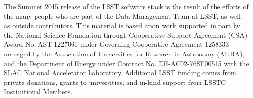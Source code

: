 \documentclass[11pt,twoside]{article}
\begin{document}
\acknowledgements The Summer 2015 release of the LSST software stack
is the result of the efforts of the many people who are part of the
Data Management Team at LSST, as well as outside contributors.  This
material is based upon work supported in part by the National Science
Foundation through Cooperative Support Agreement (CSA) Award
No. AST-1227061 under Governing Cooperative Agreement 1258333 managed
by the Association of Universities for Research in Astronomy (AURA),
and the Department of Energy under Contract No. DE-AC02-76SF00515 with
the SLAC National Accelerator Laboratory.  Additional LSST funding
comes from private donations, grants to universities, and in-kind
support from LSSTC Institutional Members.

\end{document}
